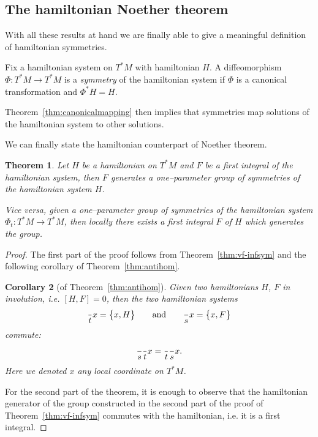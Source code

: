 \documentclass[english,fontsize=11pt,paper=a5,oneside]{scrbook}
\let\d\relax
\DeclareMathOperator{\d}{d}
\newtheorem{theorem}{Theorem}[chapter]
\newtheorem{corollary}[theorem]{Corollary}
\theoremstyle{definition}
\begin{document}
\subsection{The hamiltonian Noether theorem}

With all these results at hand we are finally able to give a meaningful definition of hamiltonian symmetries.

\begin{tcolorbox}
    Fix a hamiltonian system on $T^*M$ with hamiltonian $H$. A diffeomorphism $\Phi:T^*M\to T^* M$ is a \emph{symmetry} of the hamiltonian system if $\Phi$ is a canonical transformation and $\Phi^* H = H$.
\end{tcolorbox}

Theorem~\ref{thm:canonicalmapping} then implies that symmetries map solutions of the hamiltonian system to other solutions.

We can finally state the hamiltonian counterpart of Noether theorem.

\begin{theorem}
    Let $H$ be a hamiltonian on $T^*M$ and $F$ be a first integral of the hamiltonian system, then $F$ generates a one--parameter group of symmetries of the hamiltonian system $H$.

    Vice versa, given a one--parameter group of symmetries of the hamiltonian system $\Phi_t:T^*M\to T^* M$, then \emph{locally} there exists a first integral $F$ of $H$ which generates the group.
\end{theorem}
\begin{proof}
The first part of the proof follows from Theorem~\ref{thm:vf-infsym} and the following corollary of Theorem~\ref{thm:antihom}.

\begin{corollary}[of Theorem~\ref{thm:antihom}]
    Given two hamiltonians $H$, $F$ in involution, i.e. $[H,F]=0$, then the two hamiltonian systems
    \begin{equation}
        \frac{\d}{\d t} x = \big\{x, H\big\} \qquad\mbox{and}\qquad \frac{\d}{\d s} x = \big\{x, F\big\}
    \end{equation}
    commute:
    \begin{equation}
        \frac{\d}{\d s}\frac{\d}{\d t} x = \frac{\d}{\d t} \frac{\d}{\d s} x.
    \end{equation}
    Here we denoted $x$ any local coordinate on $T^*M$.
\end{corollary}

For the second part of the theorem, it is enough to observe that the hamiltonian generator of the group constructed in the second part of the proof of Theorem~\ref{thm:vf-infsym} commutes with the hamiltonian, i.e. it is a first integral.
\end{proof}
\end{document}
